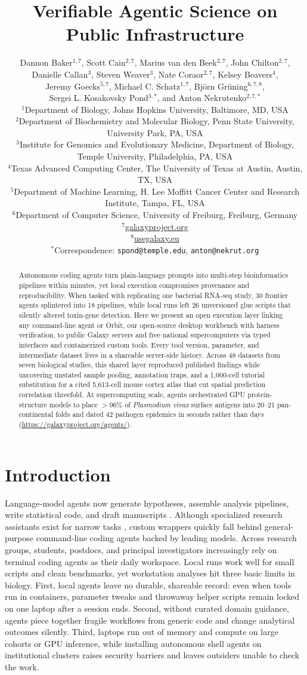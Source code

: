 \documentclass[11pt,letterpaper]{article}
\title{\textbf{Verifiable Agentic Science on Public Infrastructure}}
\author{%
  \parbox{\dimexpr\textwidth-2\tabcolsep\relax}{\centering
    Dannon Baker$^{1,7}$, Scott Cain$^{2,7}$, Marius van den Beek$^{2,7}$, John Chilton$^{2,7}$,\\
    Danielle Callan$^{3}$, Steven Weaver$^{3}$, Nate Coraor$^{2,7}$, Kelsey Beavers$^{4}$,\\
    Jeremy Goecks$^{5,7}$, Michael C. Schatz$^{1,7}$, Bj\"orn Gr\"uning$^{6,7,8}$,\\
    Sergei L. Kosakovsky Pond$^{3,*}$, and Anton Nekrutenko$^{2,7,*}$\\[0.8em]
    \small
    $^{1}$Department of Biology, Johns Hopkins University, Baltimore, MD, USA\\
    $^{2}$Department of Biochemistry and Molecular Biology, Penn State University, University Park, PA, USA\\
    $^{3}$Institute for Genomics and Evolutionary Medicine, Department of Biology,\\
    Temple University, Philadelphia, PA, USA\\
    $^{4}$Texas Advanced Computing Center, The University of Texas at Austin, Austin, TX, USA\\
    $^{5}$Department of Machine Learning, H. Lee Moffitt Cancer Center and Research Institute, Tampa, FL, USA\\
    $^{6}$Department of Computer Science, University of Freiburg, Freiburg, Germany\\
    $^{7}$\href{https://galaxyproject.org}{galaxyproject.org}\\
    $^{8}$\href{https://usegalaxy.eu}{usegalaxy.eu}\\[0.3em]
    $^{*}$Correspondence: \texttt{spond@temple.edu}, \texttt{anton@nekrut.org}
  }%
}
\date{}
\newcommand{\tool}[1]{\textsf{#1}}
\begin{document}
\maketitle

\begin{abstract}
Autonomous coding agents turn plain-language prompts into multi-step bioinformatics pipelines within minutes, yet local execution compromises provenance and reproducibility. When tasked with replicating one bacterial RNA-seq study, 30 frontier agents splintered into 18 pipelines, while local runs left 26 unversioned glue scripts that silently altered toxin-gene detection. Here we present an open execution layer linking any command-line agent or \tool{Orbit}, our open-source desktop workbench with harness verification, to public Galaxy servers and free national supercomputers via typed interfaces and containerized custom tools. Every tool version, parameter, and intermediate dataset lives in a shareable server-side history. Across 48 datasets from seven biological studies, this shared layer reproduced published findings while uncovering unstated sample pooling, annotation traps, and a 1,000-cell tutorial substitution for a cited 5,613-cell mouse cortex atlas that cut spatial prediction correlation threefold. At supercomputing scale, agents orchestrated GPU protein-structure models to place $>96\%$ of \textit{Plasmodium vivax} surface antigens into 20--21 pan-continental folds and dated 42 pathogen epidemics in seconds rather than days (\url{https://galaxyproject.org/agents/}).
\end{abstract}

\section{Introduction}

Language-model agents now generate hypotheses, assemble analysis pipelines, write statistical code, and draft manuscripts \cite{boiko2023, chemcrow2024, virtuallab2025, aiscientist2024, kosmos2025, huang2025biomni}. Although specialized research assistants exist for narrow tasks \cite{coscientist2026}, custom wrappers quickly fall behind general-purpose command-line coding agents backed by leading models. Across research groups, students, postdocs, and principal investigators increasingly rely on terminal coding agents as their daily workspace. Local runs work well for small scripts and clean benchmarks, yet workstation analyses hit three basic limits in biology. First, local agents leave no durable, shareable record: even when tools run in containers, parameter tweaks and throwaway helper scripts remain locked on one laptop after a session ends. Second, without curated domain guidance, agents piece together fragile workflows from generic code and change analytical outcomes silently. Third, laptops run out of memory and compute on large cohorts or GPU inference, while installing autonomous shell agents on institutional clusters raises security barriers and leaves outsiders unable to check the work.
\end{document}
